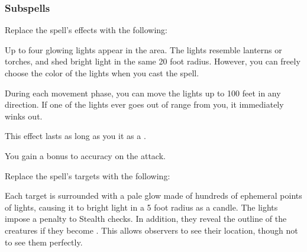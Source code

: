 \subsubsection{Subspells}





Replace the spell's effects with the following:
\begin{spellcontent}

\begin{augmenteffects}



\spelleffect
Up to four glowing lights appear in the area.
The lights resemble lanterns or torches, and shed bright light in the same 20 foot radius.
However, you can freely choose the color of the lights when you cast the spell.

During each movement phase, you can move the lights up to 100 feet in any direction.
If one of the lights ever goes out of range from you, it immediately winks out.

This effect lasts as long as you  it as a .








\end{augmenteffects}

\end{spellcontent}





You gain a  bonus to accuracy on the attack.


Replace the spell's targets with the following:
\begin{spellcontent}

\begin{augmenttargetinginfo}




\end{augmenttargetinginfo}

\end{spellcontent}






Each target is surrounded with a pale glow made of hundreds of ephemeral points of lights, causing it to bright light in a 5 foot radius as a candle.
The lights impose a  penalty to Stealth checks.
In addition, they reveal the outline of the creatures if they become .
This allows observers to see their location, though not to see them perfectly.






